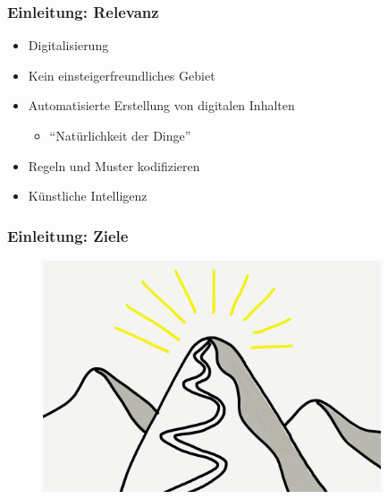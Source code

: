 \documentclass[12pt]{beamer}
\begin{document}
    \begin{frame}
        \frametitle{Einleitung: Relevanz}

        \begin{itemize}
            \setlength\itemsep{1em}
            \item<1-> Digitalisierung
            \item<2-> Kein einsteigerfreundliches Gebiet
            \item<3-> Automatisierte Erstellung von digitalen Inhalten
            \begin{itemize}
                \item "`Natürlichkeit der Dinge"'
            \end{itemize}
            \item<4-> Regeln und Muster kodifizieren
            \item<5-> Künstliche Intelligenz
        \end{itemize}
    \end{frame}

    \begin{frame}
        \frametitle{Einleitung: Ziele}

        \begin{figure}
            \centering
            \includegraphics[width=10cm]{../images/ziel.jpeg}
        \end{figure}
    \end{frame}
\end{document}
